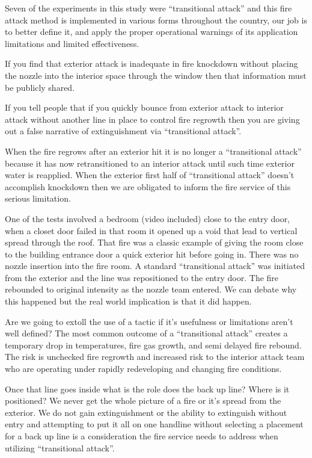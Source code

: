 \documentclass[12pt,oneside]{book}
\begin{document}
\begin{appendix}
Seven of the experiments in this study were ``transitional attack'' and this fire attack method is implemented in various forms throughout the country, our job is to better define it, and apply the proper operational warnings of its application limitations and limited effectiveness.

If you find that exterior attack is inadequate in fire knockdown without placing the nozzle into the interior space through the window then that information must be publicly shared.

If you tell people that if you quickly bounce from exterior attack to interior attack without another line in place to control fire regrowth then you are giving out a false narrative of extinguishment via ``transitional attack''. 

When the fire regrows after an exterior hit it is no longer a ``transitional attack'' because it has now retransitioned to an interior attack until such time exterior water is reapplied. When the exterior first half of ``transitional attack'' doesn't accomplish knockdown then we are obligated to inform the fire service of this serious limitation.

One of the tests involved a bedroom (video included) close to the entry door, when a closet door failed in that room it opened up a void that lead to vertical spread through the roof. That fire was a classic example of giving the room close to the building entrance door a quick exterior hit before going in. There was no nozzle insertion into the fire room. A standard ``transitional attack'' was initiated from the exterior and the line was repositioned to the entry door. The fire rebounded to original intensity as the nozzle team entered. We can debate why this happened but the real world implication is that it did happen.

Are we going to extoll the use of a tactic if it's usefulness or limitations aren't well defined? The most common outcome of a ``transitional attack'' creates a temporary drop in temperatures, fire gas growth, and semi delayed fire rebound. The risk is unchecked fire regrowth and increased risk to the interior attack team who are operating under rapidly redeveloping and changing fire conditions. 

Once that line goes inside what is the role does the back up line? Where is it positioned? We never get the whole picture of a fire or it's spread from the exterior. We do not gain extinguishment or the ability to extinguish without entry and attempting to put it all on one handline without selecting a placement for a back up line is a consideration the fire service needs to address when utilizing ``transitional attack''.


\end{appendix}
\end{document}
